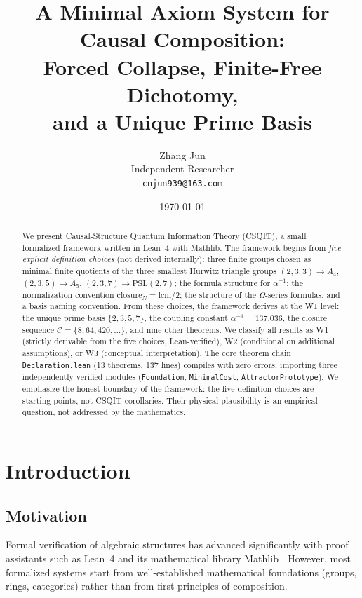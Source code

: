 ﻿\documentclass[11pt]{article}
\title{A Minimal Axiom System for Causal Composition:\\
Forced Collapse, Finite-Free Dichotomy,\\
and a Unique Prime Basis}
\author{Zhang Jun\\
Independent Researcher\\
\texttt{cnjun939@163.com}}
\date{\today}
\begin{document}
\maketitle

\begin{abstract}
We present Causal-Structure Quantum Information Theory
(CSQIT), a small formalized framework written in Lean~4 with
Mathlib. The framework begins from \emph{five explicit
definition choices} (not derived internally): three finite
groups chosen as minimal finite quotients of the three smallest
Hurwitz triangle groups $(2,3,3) \to A_4$, $(2,3,5) \to A_5$,
$(2,3,7) \to \mathrm{PSL}(2,7)$; the formula structure for
$\alpha^{-1}$; the normalization convention
$\mathrm{closure}_N = \mathrm{lcm}/2$; the structure of the
$\Omega$-series formulas; and a basis naming convention. From
these choices, the framework derives at the W1 level: the unique
prime basis $\{2,3,5,7\}$, the coupling constant
$\alpha^{-1} = 137.036$, the closure sequence
$\mathcal{C} = \{8, 64, 420, \ldots\}$, and nine other theorems.
We classify all results as W1 (strictly derivable from the
five choices, Lean-verified), W2 (conditional on additional
assumptions), or W3 (conceptual interpretation). The core
theorem chain \texttt{Declaration.lean} (13 theorems, 137 lines)
compiles with zero errors, importing three independently verified
modules (\texttt{Foundation}, \texttt{MinimalCost},
\texttt{AttractorPrototype}). We emphasize the honest boundary
of the framework: the five definition choices are starting
points, not CSQIT corollaries. Their physical plausibility is
an empirical question, not addressed by the mathematics.
\end{abstract}

\tableofcontents

\section{Introduction}

\subsection{Motivation}
Formal verification of algebraic structures has advanced
significantly with proof assistants such as Lean~4 and its
mathematical library Mathlib \cite{mathlib,lean4}. However,
most formalized systems start from well-established
mathematical foundations (groups, rings, categories) rather
than from first principles of composition.
\end{document}
